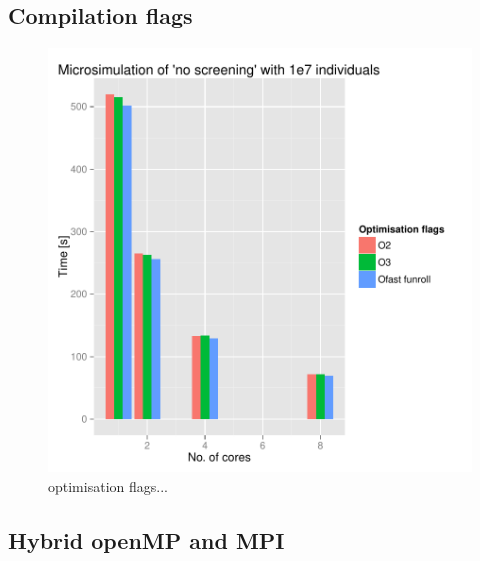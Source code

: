 \subsection{Compilation flags}

\begin{figure}[!htbp] \centering
  \includegraphics[height=0.5\textheight]{images/flagsProfiling.pdf}
  \caption{optimisation flags...}
  \label{fig:flagScaling}
\end{figure}


\subsection{Hybrid openMP and MPI}



